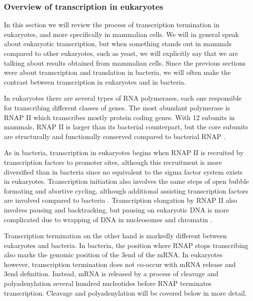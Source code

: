 %
\subsubsection{Overview of transcription in eukaryotes}
In this section we will review the process of transcription termination in
eukaryotes, and more specifically in mammalian cells. We will in general speak
about eukaryotic transcription, but when something stands out in mammals
compared to other eukaryotes, such as yeast, we will explicitly say that we are
talking about results obtained from mammalian cells. Since the previous
sections were about transcription and translation in bacteria, we will often
make the contrast between transcription in eukaryotes and in bacteria.

In eukaryotes there are several types of RNA polymerases, each one responsible
for transcribing different classes of genes. The most abundant polymerase is
RNAP II which transcribes mostly protein coding genes. With 12 subunits in
mammals, RNAP II is larger than its bacterial counterpart, but the core
subunits are structurally and functionally conserved compared to bacterial RNAP
\cite{ebright_rna_2000}.

As in bacteria, transcription in eukaryotes begins when RNAP II is recruited by
transcription factors to promoter sites, although this recruitment is more
diversified than in bacteria since no equivalent to the sigma factor system
exists in eukaryotes. Transcription initiation also involves the same steps of
open bubble formating and abortive cycling, although additional assisting
transcription factors are involved compared to bacteria
\cite{wade_transition_2008}. Transcription elongation by RNAP II also involves
pausing and backtracking, but pausing on eukaryotic DNA is more complicated due
to wrapping of DNA in nucleosomes and chromatin \cite{sims_elongation_2004}.

Transcription termination on the other hand is markedly different between
eukaryotes and bacteria. In bacteria, the position where RNAP stops
transcribing also marks the genomic position of the 3\p end of the mRNA. In
eukaryotes however, transcription termination does not co-occur with mRNA
release and 3\p end definition. Instead, mRNA is released by a process of
cleavage and polyadenylation several hundred nucleotides before RNAP terminates
transcription. Cleavage and polyadenylation will be covered below in more
detail.

